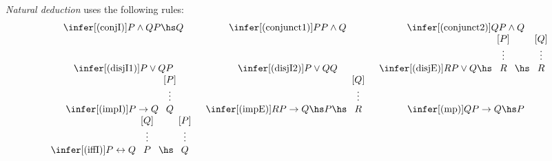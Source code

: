 \documentclass{article}
\begin{document}
\begin{definition}
	\emph{Natural deduction} uses the following rules:
	\begin{align*}
		\begin{array}{c c c}
			\infer[(\text{conjI})]{P\wedge Q}{P\hs Q}                                                          &
			\infer[(\text{conjunct1})]{P}{P\wedge Q}                                                           &
			\infer[(\text{conjunct2})]{Q}{P\wedge Q}                                                             \\
			\infer[(\text{disjI1})]{P\vee Q}{P}                                                                &
			\infer[(\text{disjI2})]{P\vee Q}{Q}                                                                &
			\infer[(\text{disjE})]{R}{P\vee Q \hs \begin{array}[b]{c}
					[P] \\ \vdots \\ R
				\end{array}
			\hs \begin{array}[b]{c}
					[Q] \\ \vdots \\ R
				\end{array}}                                                                      \\
			\infer[(\text{impI})]{P\to Q}{\begin{array}[b]{c}
					[P] \\\vdots\\Q
				\end{array}}                                          &
			\infer[(\text{impE})]{R}{P\to Q\hs P \hs \begin{array}[b]{c}
					[Q] \\\vdots\\R
				\end{array}}                               &
			\infer[(\text{mp})]{Q}{P\to Q\hs P}                                                                  \\
			\infer[(\text{iffI})]{P\leftrightarrow Q}{\begin{array}[b]{c}
					[Q] \\\vdots\\P
				\end{array}\hs\begin{array}[b]{c}
					[P] \\\vdots\\Q
				\end{array}} &

\end{array}
\end{align*}
\end{definition}
\end{document}
